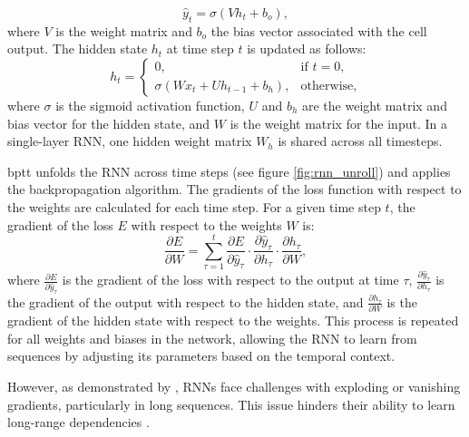 \documentclass[12pt, a4paper, headinclude, twoside, plainheadsepline, open=right, numbers=noenddot, hidelinks, toc=listof, toc=bibliography]{scrreprt}
\begin{document}
\begin{equation}
\label{eq:rnn_output}
\hat{y}_t = \sigma(V h_t + b_o),
\end{equation}
where \( V \) is the weight matrix and \( b_o \) the bias vector associated with the cell output. 
The hidden state \( h_t \) at time step \( t \) is updated as follows:
\begin{equation}
\label{eq:rnn_update} 
h_t =
\begin{cases}
	0, & \text{if } t = 0, \\
	\sigma (W x_t + U h_{t-1} + b_h), & \text{otherwise},
\end{cases}
\end{equation}
where \( \sigma \) is the sigmoid activation function, \( U \) and \( b_h \) are the weight matrix and bias vector for the hidden state, and \( W \) is the weight matrix for the input. In a single-layer RNN, one hidden weight matrix \( W_h \) is shared across all timesteps.

\Ac{bptt} unfolds the RNN across time steps (see figure \ref{fig:rnn_unroll}) and applies the backpropagation algorithm. The gradients of the loss function with respect to the weights are calculated for each time step. For a given time step \( t \), the gradient of the loss \( E \) with respect to the weights \( W \) is:
\begin{equation}
\frac{\partial E}{\partial W} = \sum_{\tau=1}^{t} \frac{\partial E}{\partial \hat{y}_\tau} \cdot \frac{\partial \hat{y}_\tau}{\partial h_\tau} \cdot \frac{\partial h_\tau}{\partial W},
\end{equation}
where $\frac{\partial E}{\partial \hat{y}_\tau}$ is the gradient of the loss with respect to the output at time \( \tau \), \( \frac{\partial \hat{y}_\tau}{\partial h_\tau} \) is the gradient of the output with respect to the hidden state, and \( \frac{\partial h_\tau}{\partial W} \) is the gradient of the hidden state with respect to the weights. This process is repeated for all weights and biases in the network, allowing the RNN to learn from sequences by adjusting its parameters based on the temporal context.

However, as demonstrated by \citeauthor{bengioLearningLongtermDependencies1994} \cite{bengioLearningLongtermDependencies1994}, RNNs face challenges with exploding or vanishing gradients, particularly in long sequences. This issue hinders their ability to learn long-range dependencies \cite{sutskeverTrainingRecurrentNeural2013}. 
\end{document}
